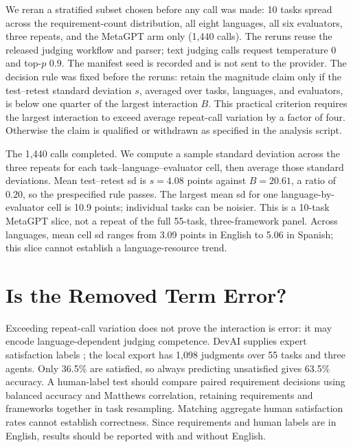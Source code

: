 \documentclass[sigconf,anonymous]{aamas}
\begin{document}
We reran a stratified subset chosen before any call was made: 10
tasks spread across the requirement-count distribution, all eight languages,
all six evaluators, three repeats, and the MetaGPT arm only (1{,}440 calls).
The reruns reuse the released judging workflow and parser; text judging
calls request temperature $0$ and top-$p$ $0.9$. The manifest seed is recorded and is not sent to the
provider. The decision rule was fixed before the reruns: retain the magnitude
claim only if the test--retest standard deviation $s$, averaged over tasks,
languages, and evaluators, is below one quarter of the largest interaction
$B$. This practical criterion requires the largest interaction to exceed
average repeat-call variation by a factor of four.
Otherwise the claim is qualified or withdrawn as specified in the
analysis script.

The 1{,}440 calls completed. We compute a sample standard deviation across
the three repeats for each task--language--evaluator cell, then average
those standard deviations. Mean test--retest sd is $s=4.08$ points against
$B=20.61$, a ratio of $0.20$, so the prespecified rule passes. The largest
mean sd for one language-by-evaluator cell is 10.9 points; individual tasks
can be noisier. This is a 10-task MetaGPT slice, not a repeat of the full
55-task, three-framework panel. Across languages, mean cell sd ranges
from 3.09 points in English to 5.06 in Spanish; this slice cannot
establish a language-resource trend.

\section{Is the Removed Term Error?}
\label{sec:anchor}

Exceeding repeat-call variation does not prove the interaction is error:
it may encode language-dependent judging competence. DevAI supplies expert
satisfaction labels \citep{zhuge2024agentjudge}; the local export has
1{,}098 judgments over 55 tasks and three agents. Only 36.5\% are satisfied,
so always predicting unsatisfied gives 63.5\% accuracy. A human-label test
should compare paired requirement decisions using balanced accuracy and
Matthews correlation, retaining requirements and frameworks together in
task resampling. Matching aggregate human satisfaction rates cannot
establish correctness. Since requirements and human labels are in English,
results should be reported with and without English.
\end{document}
